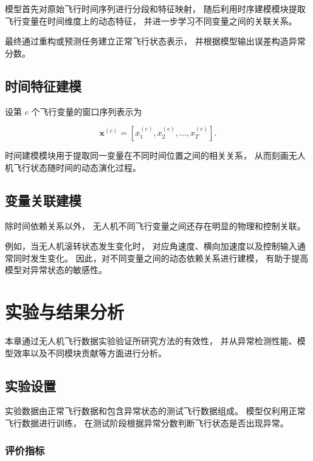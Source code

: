 \documentclass[
  degree=master,
  degree-type=academic
]{gzuthesis}
\begin{document}
模型首先对原始飞行时间序列进行分段和特征映射，
随后利用时序建模模块提取飞行变量在时间维度上的动态特征，
并进一步学习不同变量之间的关联关系。

最终通过重构或预测任务建立正常飞行状态表示，
并根据模型输出误差构造异常分数。


\section{时间特征建模}

设第 $c$ 个飞行变量的窗口序列表示为

\begin{equation}
    \mathbf{x}^{(c)}
    =
    \left[
        x_1^{(c)},
        x_2^{(c)},
        \ldots,
        x_T^{(c)}
    \right].
\end{equation}

时间建模模块用于提取同一变量在不同时间位置之间的相关关系，
从而刻画无人机飞行状态随时间的动态演化过程。


\section{变量关联建模}

除时间依赖关系以外，
无人机不同飞行变量之间还存在明显的物理和控制关联。

例如，当无人机滚转状态发生变化时，
对应角速度、横向加速度以及控制输入通常同时发生变化。
因此，对不同变量之间的动态依赖关系进行建模，
有助于提高模型对异常状态的敏感性。



\chapter{实验与结果分析}

本章通过无人机飞行数据实验验证所研究方法的有效性，
并从异常检测性能、模型效率以及不同模块贡献等方面进行分析。


\section{实验设置}

实验数据由正常飞行数据和包含异常状态的测试飞行数据组成。
模型仅利用正常飞行数据进行训练，
在测试阶段根据异常分数判断飞行状态是否出现异常。


\subsection{评价指标}
\end{document}
